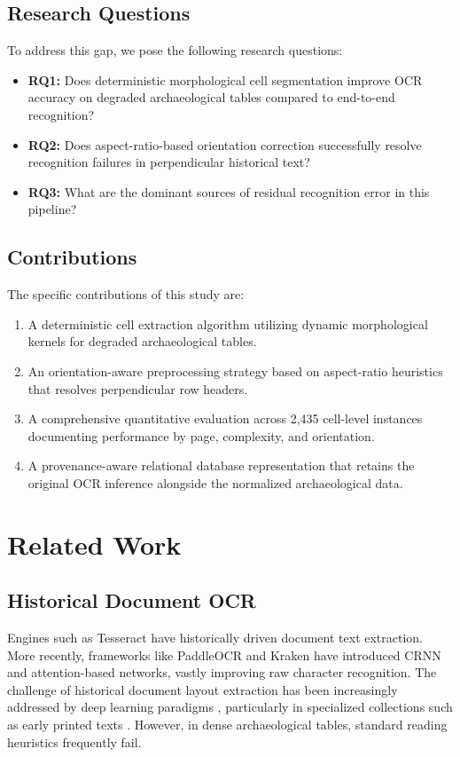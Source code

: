 \documentclass[pdflatex,sn-mathphys-num]{sn-jnl}
\begin{document}
\subsection{Research Questions}
To address this gap, we pose the following research questions:
\begin{itemize}
    \item \textbf{RQ1:} Does deterministic morphological cell segmentation improve OCR accuracy on degraded archaeological tables compared to end-to-end recognition?
    \item \textbf{RQ2:} Does aspect-ratio-based orientation correction successfully resolve recognition failures in perpendicular historical text?
    \item \textbf{RQ3:} What are the dominant sources of residual recognition error in this pipeline?
\end{itemize}

\subsection{Contributions}
The specific contributions of this study are:
\begin{enumerate}
    \item A deterministic cell extraction algorithm utilizing dynamic morphological kernels for degraded archaeological tables.
    \item An orientation-aware preprocessing strategy based on aspect-ratio heuristics that resolves perpendicular row headers.
    \item A comprehensive quantitative evaluation across 2,435 cell-level instances documenting performance by page, complexity, and orientation.
    \item A provenance-aware relational database representation that retains the original OCR inference alongside the normalized archaeological data.
\end{enumerate}


\section{Related Work}
\label{sec:related}

\subsection{Historical Document OCR}
Engines such as Tesseract \cite{smith2007overview} have historically driven document text extraction. More recently, frameworks like PaddleOCR and Kraken have introduced CRNN and attention-based networks, vastly improving raw character recognition. The challenge of historical document layout extraction has been increasingly addressed by deep learning paradigms \cite{Cuo201996, Zottin2026647}, particularly in specialized collections such as early printed texts \cite{Clausner20191527}. However, in dense archaeological tables, standard reading heuristics frequently fail. 
\end{document}
